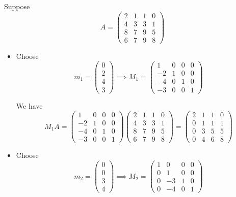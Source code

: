 \begin{example}
    Suppose \[
        A = \begin{pmatrix}
            2 & 1 & 1 & 0 \\ 4 & 3 & 3 & 1 \\ 8 & 7 & 9 & 5 \\ 6 & 7 & 9 & 8
        \end{pmatrix}
    \]

    \begin{itemize}
        \item Choose \[
                  m_1 = \begin{pmatrix}
                      0 \\ 2 \\ 4 \\ 3
                  \end{pmatrix}
                  \implies
                  M_1 = \begin{pmatrix}
                      1 & 0 & 0 & 0 \\ -2 & 1 & 0 & 0 \\ -4 & 0 & 1 & 0 \\ -3 & 0 & 0 & 1
                  \end{pmatrix}
              \]

              We have \[
                  M_1 A
                  =
                  \begin{pmatrix}
                      1 & 0 & 0 & 0 \\ -2 & 1 & 0 & 0 \\ -4 & 0 & 1 & 0 \\ -3 & 0 & 0 & 1
                  \end{pmatrix}
                  \begin{pmatrix}
                      2 & 1 & 1 & 0 \\ 4 & 3 & 3 & 1 \\ 8 & 7 & 9 & 5 \\ 6 & 7 & 9 & 8
                  \end{pmatrix}
                  =
                  \begin{pmatrix}
                      2 & 1 & 1 & 0 \\ 0 & 1 & 1 & 1 \\ 0 & 3 & 5 & 5 \\ 0 & 4 & 6 & 8
                  \end{pmatrix}
              \]

        \item Choose \[
                  m_2 = \begin{pmatrix}
                      0 \\ 0 \\ 3 \\ 4
                  \end{pmatrix}
                  \implies
                  M_2 = \begin{pmatrix}
                      1 & 0 & 0 & 0 \\ 0 & 1 & 0 & 0 \\ 0 & -3 & 1 & 0 \\ 0 & -4 & 0 & 1
                  \end{pmatrix}
              \]


\end{itemize}
\end{example}
